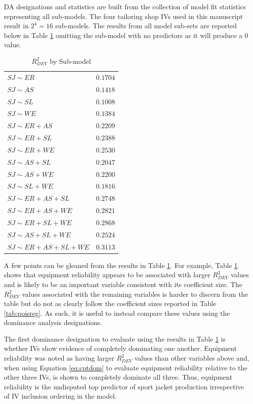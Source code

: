 \documentclass[ShortAfour,times,sageapa]{sagej}
\begin{document}
	DA designations and statistics are built from the collection of model fit statistics representing all sub-models.
	The four tailoring shop IVs used in this manuscript result in $2^4 = 16$ sub-models.
	The results from all model sub-sets are reported below in Table \ref{tab:r2sub} omitting the sub-model with no predictors as it will produce a 0 value.
	
	\begin{table}[h!]
		\centering
		\caption{\centering $R^2_{DEV}$ by Sub-model}
		\begin{tabular}{l|r}
			\toprule
			$SJ \sim ER$ & $0.1704$ \\ 
			$SJ \sim AS$ & $0.1418$ \\ 
			$SJ \sim SL$ & $0.1008$ \\ 
			$SJ \sim WE$ & $0.1384$ \\ 
			$SJ \sim ER + AS$ & $0.2209$ \\ 
			$SJ \sim ER + SL$ & $0.2388$ \\ 
			$SJ \sim ER + WE$ & $0.2530$ \\ 
			$SJ \sim AS + SL$ & $0.2047$ \\ 
			$SJ \sim AS + WE$ & $0.2200$ \\ 
			$SJ \sim SL + WE$ & $0.1816$ \\ 
			$SJ \sim ER + AS + SL$ & $0.2748$\\ 
			$SJ \sim ER + AS + WE$ & $0.2821$ \\ 
			$SJ \sim ER + SL + WE$ & $0.2868$ \\ 
			$SJ \sim AS + SL + WE$ & $0.2524$ \\ 
			$SJ \sim ER + AS + SL + WE$ & $0.3113$ \\ 
			\bottomrule
		\end{tabular}
		\label{tab:r2sub}
	\end{table}

	A few points can be gleaned from the results in Table \ref{tab:r2sub}. 
	For example, Table \ref{tab:r2sub}. shows that equipment reliability appears to be associated with larger $R^2_{DEV}$ values and is likely to be an important variable consistent with its coefficient size. 
	The $R^2_{DEV}$ values associated with the remaining variables is harder to discern from the table but do not as clearly follow the coefficient sizes reported in Table \ref{tab:poisreg}.
	As such, it is useful to instead compare these values using the dominance analysis designations.
	
	The first dominance designation to evaluate using the results in Table \ref{tab:r2sub} is whether IVs show evidence of completely dominating one another.
	Equipment reliability was noted as having larger $R^2_{DEV}$ values than other variables above and, when using Equation \ref{eq:cptdom} to evaluate equipment reliability relative to the other three IVs, is shown to completely dominate all three.
	Thus, equipment reliability is the undisputed top predictor of sport jacket production irrespective of IV inclusion ordering in the model.	
	
\end{document}

